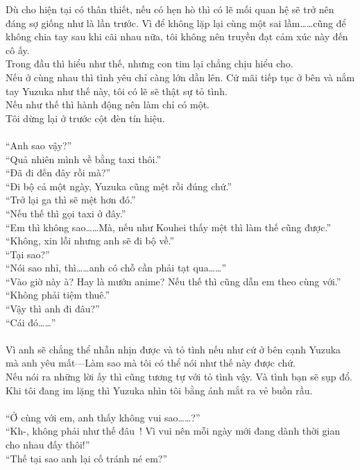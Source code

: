 \documentclass[12pt,a4paper, twosides]{book}
\begin{document}
Dù cho hiện tại có thân thiết, nếu có hẹn hò thì có lẽ mối quan hệ sẽ trở nên đáng sợ giống như là lần trước. Vì để không lặp lại cùng một sai lầm……cũng để không chia tay sau khi cãi nhau nữa, tôi không nên truyền đạt cảm xúc này đến cô ấy.\\
Trong đầu thì hiểu như thế, nhưng con tim lại chẳng chịu hiểu cho.\\
Nếu ở cùng nhau thì tình yêu chỉ càng lớn dần lên. Cứ mãi tiếp tục ở bên và nắm tay Yuzuka như thế này, tôi có lẽ sẽ thật sự tỏ tình.\\
Nếu như thế thì hành động nên làm chỉ có một.\\
Tôi dừng lại ở trước cột đèn tín hiệu.\\
\\
“Anh sao vậy?”\\
“Quả nhiên mình về bằng taxi thôi.”\\
“Đã đi đến đây rồi mà?”\\
“Đi bộ cả một ngày, Yuzuka cũng mệt rồi đúng chứ.”\\
“Trở lại ga thì sẽ mệt hơn đó.”\\
“Nếu thế thì gọi taxi ở đây.”\\
“Em thì không sao……Mà, nếu như Kouhei thấy mệt thì làm thế cũng được.”\\
“Không, xin lỗi nhưng anh sẽ đi bộ về.”\\
“Tại sao?”\\
“Nói sao nhỉ, thì……anh có chỗ cần phải tạt qua……”\\
“Vào giờ này à? Hay là mướn anime? Nếu thế thì cũng dẫn em theo cùng với.”\\
“Không phải tiệm thuê.”\\
“Vậy thì anh đi đâu?”\\
“Cái đó……”\\
\\
Vì anh sẽ chẳng thể nhẫn nhịn được và tỏ tình nếu như cứ ở bên cạnh Yuzuka mà anh yêu mất—Làm sao mà tôi có thể nói như thế này được chứ.\\
Nếu nói ra những lời ấy thì cũng tương tự với tỏ tình vậy. Và tình bạn sẽ sụp đổ.\\
Khi tôi đang im lặng thì Yuzuka nhìn tôi bằng ánh mắt ra vẻ buồn rầu.\\
\\
“Ở cùng với em, anh thấy không vui sao……?”\\
“Kh-, không phải như thế đâu~! Vì vui nên mỗi ngày mới đang dành thời gian cho nhau đấy thôi!”\\
“Thế tại sao anh lại cố tránh né em?”\\
\end{document}
